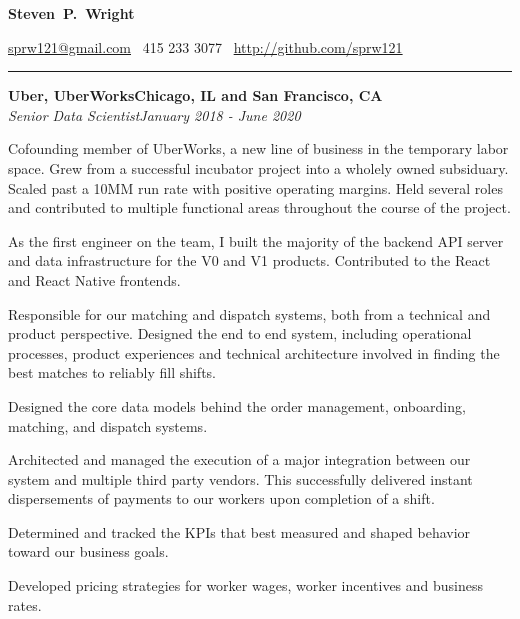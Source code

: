 \documentclass{article}
\newcommand{\ressection}[1]{\noindent{\large\textbf{#1}}\vspace{2pt}\hrule\vspace{4pt}}
\newcommand{\leftandright}[2]{\noindent\textbf{#1}\hfill\textbf{#2}}
\newcommand{\leftandrighti}[2]{\indent\textit{#1}\hfill\textit{#2}}
\begin{document}
\sffamily

\begin{center}
\textbf{\huge{Steven~P.~Wright}}

\href{mailto:sprw121@gmail.com}{sprw121@gmail.com}
\textbullet\, 415 233 3077
\textbullet\, \href{https://github.com/sprw121}{http://github.com/sprw121}
\end{center}

\ressection{Work experience}

\leftandright{Uber, UberWorks}{Chicago, IL and San Francisco, CA} \\
\leftandrighti{Senior Data Scientist}
	      {January 2018 - June 2020}
\begin{itemize*}
\item Cofounding member of UberWorks, a new line of business in the temporary labor space. Grew from a successful incubator project into a wholely owned subsiduary. Scaled past a 10MM run rate with positive operating margins. Held several roles and contributed to multiple functional areas throughout the course of the project.
\item As the first engineer on the team, I built the majority of the backend API server and data infrastructure for the V0 and V1 products. Contributed to the React and React Native frontends.
\item Responsible for our matching and dispatch systems, both from a technical and product perspective. Designed the end to end system, including operational processes, product experiences and technical architecture involved in finding the best matches to reliably fill shifts.
\item Designed the core data models behind the order management, onboarding, matching, and dispatch systems.
\item Architected and managed the execution of a major integration between our system and multiple third party vendors. This successfully delivered instant dispersements of payments to our workers upon completion of a shift.
\item Determined and tracked the KPIs that best measured and shaped behavior toward our business goals.
\item Developed pricing strategies for worker wages, worker incentives  and business rates.
\end{itemize*}
\end{document}
